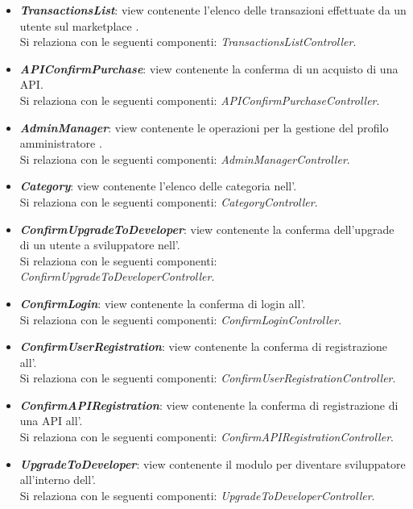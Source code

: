 \begin{itemize}
\begin{itemize}
		\item \textbf{\textit{TransactionsList}}: view contenente l'elenco delle transazioni effettuate da un utente sul marketplace \progetto.\\
		Si relaziona con le seguenti componenti: \textit{TransactionsListController}.
				
		\item \textbf{\textit{APIConfirmPurchase}}: view contenente la conferma di un acquisto di una API.\\
		Si relaziona con le seguenti componenti: \textit{APIConfirmPurchaseController}.
				
		\item \textbf{\textit{AdminManager}}: view contenente le operazioni per la gestione del profilo amministratore \progetto.\\
		Si relaziona con le seguenti componenti: \textit{AdminManagerController}.
		
		\item \textbf{\textit{Category}}: view contenente l'elenco delle categoria nell'\progetto.\\
		Si relaziona con le seguenti componenti: \textit{CategoryController}.
		
		\item \textbf{\textit{ConfirmUpgradeToDeveloper}}: view contenente la conferma dell'upgrade di un utente a sviluppatore nell'\progetto.\\
		Si relaziona con le seguenti componenti: \textit{ConfirmUpgradeToDeveloperController}.
		
		\item \textbf{\textit{ConfirmLogin}}: view contenente la conferma di login all'\progetto.\\
		Si relaziona con le seguenti componenti: \textit{ConfirmLoginController}.
		
		\item \textbf{\textit{ConfirmUserRegistration}}: view contenente la conferma di registrazione all'\progetto.\\
		Si relaziona con le seguenti componenti: \textit{ConfirmUserRegistrationController}.
		
		\item \textbf{\textit{ConfirmAPIRegistration}}: view contenente la conferma di registrazione di una API all'\progetto.\\
		Si relaziona con le seguenti componenti: \textit{ConfirmAPIRegistrationController}.
		
		\item \textbf{\textit{UpgradeToDeveloper}}: view contenente il modulo per diventare sviluppatore all'interno dell'\progetto.\\
		Si relaziona con le seguenti componenti: \textit{UpgradeToDeveloperController}.
		

\end{itemize}
\end{itemize}
